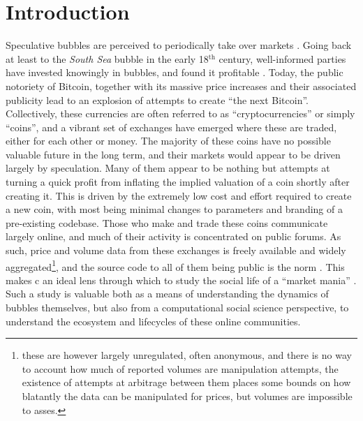 \section{Introduction}

Speculative bubbles are perceived to periodically take over markets \cite{garber2001famous}.
Going back at least to the \emph{South Sea} bubble in the early 18$^{\text{th}}$ century, well-informed parties  have invested knowingly in bubbles, and found it profitable \cite{temin2004riding}.
Today, the public notoriety of Bitcoin, together with its massive price increases and their associated publicity lead to an explosion of attempts to create ``the next Bitcoin''.
Collectively, these currencies are often referred to as ``cryptocurrencies'' or simply ``coins'', and a vibrant set of exchanges have emerged where these are traded, either for each other or money.
The majority of these coins have no possible valuable future in the long term, and their markets would appear to be driven largely by speculation.
Many of them appear to be nothing but attempts at turning a quick profit from inflating the implied valuation of a coin shortly after creating it.
This is driven by the extremely low cost and effort required to create a new coin, with most being minimal changes to parameters and branding of a pre-existing codebase.
Those who make and trade these coins communicate largely online, and much of their activity is concentrated on public forums. 
As such, price and volume data from these exchanges is freely available and widely aggregated\footnote{ these are however largely unregulated, often anonymous, and there is no way to account how much of reported volumes are manipulation attempts, the existence of attempts at arbitrage between them places some bounds on how blatantly the data can be manipulated for prices, but volumes are impossible to asses. }, and the source code to all of them being public is the norm%
. This makes c
an ideal lens through which to study the social life of a ``market mania'' \cite{cosma2008}.
Such a study is valuable both as a means of understanding the dynamics of bubbles themselves, but also from a computational social science perspective, to understand the ecosystem and lifecycles of these online communities.


